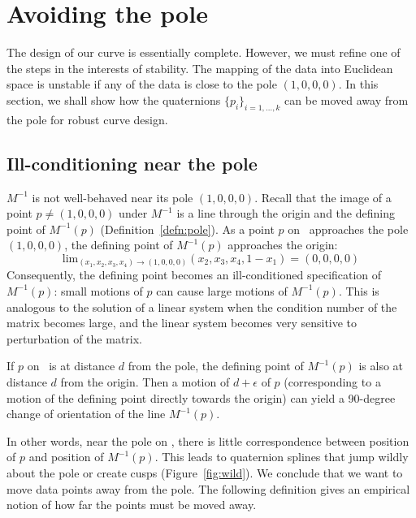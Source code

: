 \section{Avoiding the pole}
\label{sec:avoid}

The design of our curve is essentially complete.
However, we must refine one of the steps in the interests of stability.
The mapping of the data into Euclidean space is unstable
if any of the data is close to the pole $(1,0,0,0)$.
In this section, we shall show how the quaternions $\{p_i\}_{i=1,\ldots,k}$
can be moved away from the pole for robust curve design.

\subsection{Ill-conditioning near the pole}
\label{sec:ill}

$M^{-1}$ is not well-behaved near 
its pole $(1,0,0,0)$.
Recall that the image of a point $p \neq (1,0,0,0)$ 
under $M^{-1}$ is a line through the
origin and the defining point of $M^{-1}(p)$ (Definition~\ref{defn:pole}).
As a point $p$ on \ approaches the pole $(1,0,0,0)$,
the defining point of $M^{-1}(p)$ approaches the origin:
\[ 
\mbox{lim}_{(x_1,x_2,x_3,x_4) \rightarrow (1,0,0,0)} (x_2,x_3,x_4,1-x_1)
= (0,0,0,0) 
\]
Consequently, the defining point becomes an ill-conditioned specification
of $M^{-1}(p)$:
small motions of $p$ can cause large motions of $M^{-1}(p)$.
This is analogous to the solution of a linear
system when the condition number of the matrix becomes large,
and the linear system becomes very sensitive to perturbation of the matrix.

\begin{example}
If $p$ on \ is at distance $d$ from the pole,
the defining point of $M^{-1}(p)$ is also at distance $d$ from the
origin.
Then a motion of $d+\epsilon$ of $p$ (corresponding to a motion
of the defining point directly towards the origin) can yield
a 90-degree change of orientation of the line $M^{-1}(p)$.
\end{example}

In other words, near the pole on , there is little correspondence 
between position of $p$ and position of $M^{-1}(p)$.
This leads to quaternion splines that jump wildly about the pole 
or create cusps (Figure~\ref{fig:wild}).
We conclude that we want to move data points away from the pole.
The following definition gives an empirical notion of how far the points
must be moved away.

